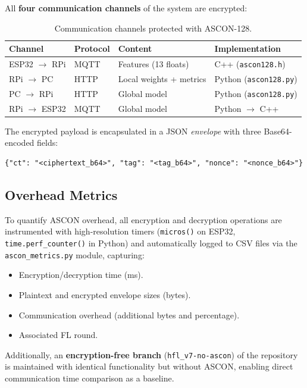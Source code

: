 All \textbf{four communication channels} of the system are encrypted:

\begin{table}[H]
\centering
\caption{Communication channels protected with ASCON-128.}
\label{tab:canales_ascon}
\begin{tabular}{l l l l}
\toprule
\textbf{Channel} & \textbf{Protocol} & \textbf{Content} & \textbf{Implementation} \\
\midrule
ESP32 $\to$ RPi & MQTT & Features (13 floats)    & C++ (\texttt{ascon128.h}) \\
RPi $\to$ PC    & HTTP & Local weights + metrics  & Python (\texttt{ascon128.py}) \\
PC $\to$ RPi    & HTTP & Global model             & Python (\texttt{ascon128.py}) \\
RPi $\to$ ESP32 & MQTT & Global model             & Python $\to$ C++ \\
\bottomrule
\end{tabular}
\end{table}

The encrypted payload is encapsulated in a JSON \emph{envelope} with three Base64-encoded fields:
\begin{verbatim}
{"ct": "<ciphertext_b64>", "tag": "<tag_b64>", "nonce": "<nonce_b64>"}
\end{verbatim}

\subsection{Overhead Metrics}

To quantify ASCON overhead, all encryption and decryption operations are instrumented with high-resolution timers (\texttt{micros()} on ESP32, \texttt{time.perf\_counter()} in Python) and automatically logged to CSV files via the \texttt{ascon\_metrics.py} module, capturing:

\begin{itemize}
    \item Encryption/decryption time (ms).
    \item Plaintext and encrypted envelope sizes (bytes).
    \item Communication overhead (additional bytes and percentage).
    \item Associated FL round.
\end{itemize}

Additionally, an \textbf{encryption-free branch} (\texttt{hfl\_v7-no-ascon}) of the repository is maintained with identical functionality but without ASCON, enabling direct communication time comparison as a baseline.

